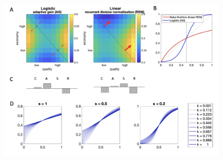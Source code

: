 \documentclass[a4paper, nobind]{templates/ociamthesis}
\begin{document}
\begin{figure}

{\centering \includegraphics[width=1\linewidth]{figures/decoy-nonlinearity} 

}


\end{figure}
\end{document}
